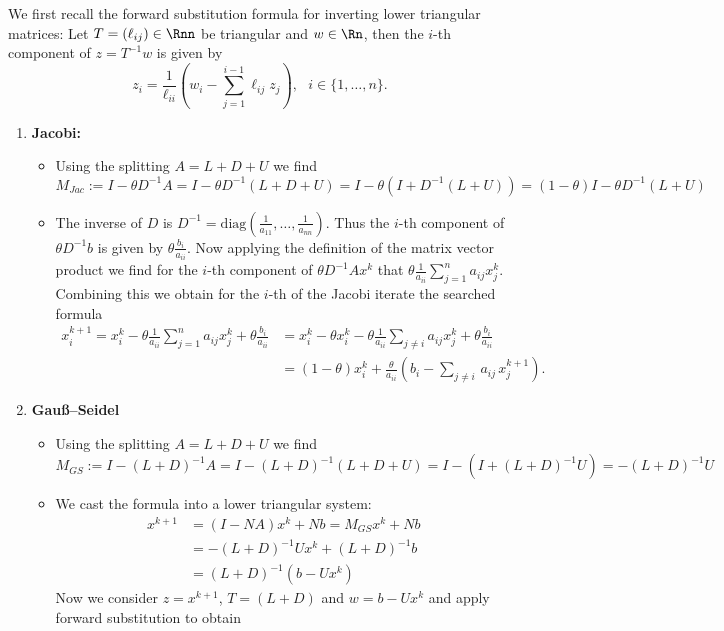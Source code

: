 {\color{solution}
{\color{navy}
We first recall the forward substitution formula for inverting lower triangular matrices: Let $T = (\ell_{ij})\in\Rnn$ be triangular and $w \in \Rn$, then the $i$-th component of $z=T^{-1}w$ is given by
$$z_i =\frac{1}{\ell_{ii}}\left(w_i-\sum_{j=1}^{i-1}\ell_{ij}z_j\right),~~~i\in\{1,\ldots,n\}.$$

}
\begin{enumerate}
	\item \textbf{Jacobi:}
	\begin{itemize}
		\item Using the splitting $A=L+D+U$ we find
		$$M_{Jac} := I-\theta D^{-1}A = I-\theta D^{-1}(L+D+U)=I-\theta(I + D^{-1}(L+U))= (1-\theta)I - \theta D^{-1}(L+U)$$
		\item The inverse of $D$ is $D^{-1}= \text{diag}(\frac{1}{a_{11}},\ldots, \frac{1}{a_{nn}})$. Thus the $i$-th component of $\theta D^{-1} b$ is given by 
		$\theta \frac{b_i}{a_{ii}} .$ 
		Now applying the definition of the matrix vector product we find for the $i$-th component of $\theta D^{-1}A x^k  $ that
		$\theta \frac{1}{a_{ii}} \sum_{j=1}^n a_{ij}x^k_j $. Combining this we obtain for the $i$-th of the Jacobi iterate the searched formula
		\begin{align*}
		x_{i}^{k+1}= x_i^k -\theta \frac{1}{a_{ii}} \sum_{j=1}^n a_{ij}x^k_j  + \theta \frac{b_i}{a_{ii}}  
		&= x_i^k -\theta x_i^k  -\theta\frac{1}{a_{ii}} \sum_{j\neq i}  a_{ij}x^k_j  + \theta \frac{b_i}{a_{ii}}\\
		&= (1-\theta)x_i^k +  \frac{\theta}{a_{ii}}\left( b_i - \sum_{j\neq i} \,a_{ij} \, x_j^{k+1}\right).
		\end{align*}
	\end{itemize}
	\item \textbf{Gauß--Seidel}
	\begin{itemize}
		\item Using the splitting $A=L+D+U$ we find
		$$M_{GS} := I- (L+D)^{-1}A = I- (L+D)^{-1}(L+D+U) =   I- (I+(L+D)^{-1} U)   =     -(L+D)^{-1}U$$
		\item We cast the formula into a lower triangular system:
		\begin{align*}
		 x^{k+1} &=  (I-NA)x^k + Nb   =M_{GS}x^k + Nb\\
		 & =-(L+D)^{-1}Ux^k + (L+D)^{-1}b\\
		 & = (L+D)^{-1}(b-Ux^k)
		\end{align*}
		Now we consider $z= x^{k+1}$, $T=(L+D)$ and $w = b-Ux^k$ and apply forward substitution to obtain
	\begin{align*}

\end{align*}
\end{itemize}
\end{enumerate}}
